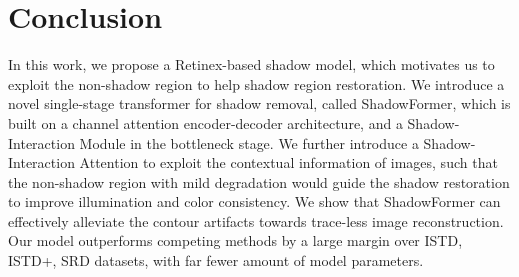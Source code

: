 \documentclass[letterpaper]{article} \usepackage{aaai23}  \usepackage{times}  \usepackage{helvet}  \usepackage{courier}  \usepackage[hyphens]{url}  \usepackage{graphicx} \urlstyle{rm} \def\UrlFont{\rm}  \usepackage{natbib}  \usepackage{caption} \frenchspacing  \setlength{\pdfpagewidth}{8.5in} \setlength{\pdfpageheight}{11in} \usepackage{algorithm}
\begin{document}
\section{Conclusion}
In this work, we propose a Retinex-based shadow model, which motivates us to exploit the non-shadow region to help shadow region restoration.
We introduce a novel single-stage transformer for shadow removal, called ShadowFormer, which is built on a channel attention encoder-decoder architecture, and a Shadow-Interaction Module in the bottleneck stage.
We further introduce a Shadow-Interaction Attention to exploit the contextual information of images, such that the non-shadow region with mild degradation would guide the shadow restoration to improve illumination and color consistency. 
We show that ShadowFormer can effectively alleviate the contour artifacts towards trace-less image reconstruction.
Our model outperforms competing methods by a large margin over ISTD, ISTD+, SRD datasets, with far fewer amount of model parameters.


\end{document}
